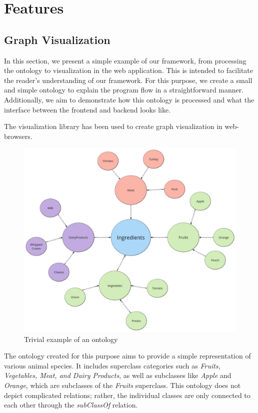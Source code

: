 \section{Features}

\subsection{Graph Visualization}
In this section, we present a simple example of our framework, from processing the ontology to visualization in the web application. 
This is intended to facilitate the reader's understanding of our framework. 
For this purpose, we create a small and simple ontology to explain the program flow in a straightforward manner. 
Additionally, we aim to demonstrate how this ontology is processed and what the interface between the frontend and backend looks like.

The visualization library \cite{visjs} has been used to create graph visualization in web-browsers.

\begin{figure}[H]
    \includegraphics[scale=0.4]{Graphics/simple_ontology.jpg}
    \caption{Trivial example of an ontology}
    \end{figure}
    
The ontology created for this purpose aims to provide a simple representation of various animal species. It includes superclass categories such as \textit{Fruits, Vegetables, Meat, and Dairy Products}, as well as subclasses like \textit{Apple} and \textit{Orange}, which are subclasses of the \textit{Fruits} superclass. This ontology does not depict complicated relations; rather, the individual classes are only connected to each other through the \textit{subClassOf} relation.
    

